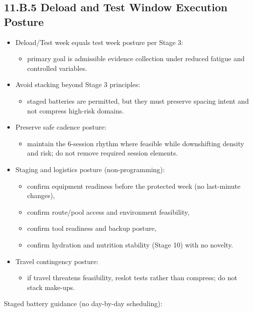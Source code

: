\documentclass[10pt]{article}
\begin{document}
\endgroup

\subsection*{11.B.5 Deload and Test Window Execution Posture}
{}

\begin{itemize}
\item Deload/Test week equals test week posture per Stage 3:
\begin{itemize}
\item primary goal is admissible evidence collection under reduced fatigue and controlled variables.
\end{itemize}
\item Avoid stacking beyond Stage 3 principles:
\begin{itemize}
\item staged batteries are permitted, but they must preserve spacing intent and not compress high-risk domains.
\end{itemize}
\item Preserve safe cadence posture:
\begin{itemize}
\item maintain the 6-session rhythm where feasible while downshifting density and risk; do not remove required session elements.
\end{itemize}
\item Staging and logistics posture (non-programming):
\begin{itemize}
\item confirm equipment readiness before the protected week (no last-minute changes),
\item confirm route/pool access and environment feasibility,
\item confirm tool readiness and backup posture,
\item confirm hydration and nutrition stability (Stage 10) with no novelty.
\end{itemize}
\item Travel contingency posture:
\begin{itemize}
\item if travel threatens feasibility, reslot tests rather than compress; do not stack make-ups.
\end{itemize}
\end{itemize}

Staged battery guidance (no day-by-day scheduling):
\end{document}
